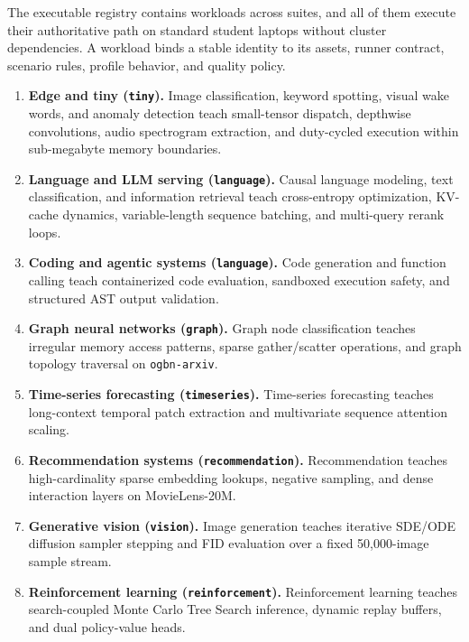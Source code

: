 \documentclass[10pt,twocolumn]{article}
\begin{document}
The executable registry contains \RegistryRows{} workloads across \RegistrySuites{} suites, and all \LocallyRunnableWorkloads{} of them execute their authoritative path on standard student laptops without cluster dependencies. A workload binds a stable identity to its assets, runner contract, scenario rules, profile behavior, and quality policy.

\begin{enumerate}[leftmargin=*,itemsep=2pt]
\item \textbf{Edge and tiny (\texttt{tiny}).} Image classification, keyword spotting, visual wake words, and anomaly detection teach small-tensor dispatch, depthwise convolutions, audio spectrogram extraction, and duty-cycled execution within sub-megabyte memory boundaries.
\item \textbf{Language and LLM serving (\texttt{language}).} Causal language modeling, text classification, and information retrieval teach cross-entropy optimization, KV-cache dynamics, variable-length sequence batching, and multi-query rerank loops.
\item \textbf{Coding and agentic systems (\texttt{language}).} Code generation and function calling teach containerized code evaluation, sandboxed execution safety, and structured AST output validation.
\item \textbf{Graph neural networks (\texttt{graph}).} Graph node classification teaches irregular memory access patterns, sparse gather/scatter operations, and graph topology traversal on \texttt{ogbn-arxiv}.
\item \textbf{Time-series forecasting (\texttt{timeseries}).} Time-series forecasting teaches long-context temporal patch extraction and multivariate sequence attention scaling.
\item \textbf{Recommendation systems (\texttt{recommendation}).} Recommendation teaches high-cardinality sparse embedding lookups, negative sampling, and dense interaction layers on MovieLens-20M.
\item \textbf{Generative vision (\texttt{vision}).} Image generation teaches iterative SDE/ODE diffusion sampler stepping and FID evaluation over a fixed 50,000-image sample stream.
\item \textbf{Reinforcement learning (\texttt{reinforcement}).} Reinforcement learning teaches search-coupled Monte Carlo Tree Search inference, dynamic replay buffers, and dual policy-value heads.
\end{enumerate}
\end{document}
